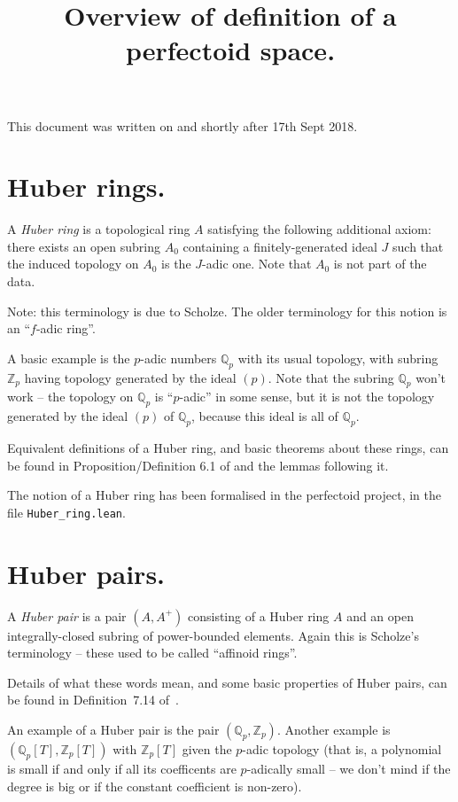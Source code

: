 \documentclass{amsart}
\title{Overview of definition of a perfectoid space.}
\newcommand{\Q}{\mathbb{Q}}
\newcommand{\Z}{\mathbb{Z}}
\theoremstyle{plain}
\theoremstyle{remark}
\begin{document}
\maketitle

This document was written on and shortly after 17th Sept 2018.

\section{Huber rings.}

A \emph{Huber ring} is a topological ring $A$ satisfying the following additional axiom: there exists an open subring $A_0$ containing a finitely-generated ideal $J$ such that the induced topology on $A_0$ is the $J$-adic one. Note that $A_0$ is not part of the data.

Note: this terminology is due to Scholze. The older terminology for this notion is an ``$f$-adic ring''.

A basic example is the $p$-adic numbers $\Q_p$ with its usual topology, with subring $\Z_p$ having topology generated by the ideal $(p)$. Note that the subring $\Q_p$ won't work -- the topology on $\Q_p$ is ``$p$-adic'' in some sense, but it is not the topology generated by the ideal $(p)$ of $\Q_p$, because this ideal is all of $\Q_p$.

Equivalent definitions of a Huber ring, and basic theorems about these rings, can be found in Proposition/Definition 6.1 of \cite{wedhorn} and the lemmas following it.

The notion of a Huber ring has been formalised in the perfectoid project, in the file {\tt Huber\_ring.lean}.

\section{Huber pairs.}

A \emph{Huber pair} is a pair $(A,A^+)$ consisting of a Huber ring $A$ and an open integrally-closed subring of power-bounded elements. Again this is Scholze's terminology -- these used to be called ``affinoid rings''. 

Details of what these words mean, and some basic properties of Huber pairs, can be found in Definition~7.14 of~\cite{wedhorn}.

An example of a Huber pair is the pair $(\Q_p,\Z_p)$. Another example is $(\Q_p[T],\Z_p[T])$ with $\Z_p[T]$ given the $p$-adic topology (that is, a polynomial is small if and only if all its coefficents are $p$-adically small -- we don't mind if the degree is big or if the constant coefficient is non-zero).
\end{document}
